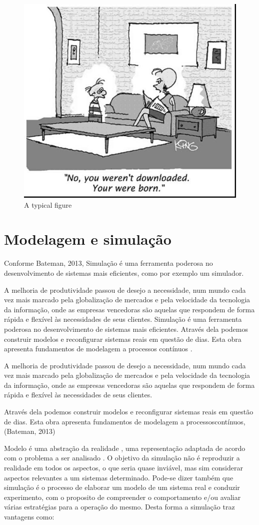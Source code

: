 \documentclass[12pt]{article}
\begin{document}
\begin{figure}[ht]
\centering
\includegraphics[width=.5\textwidth]{fig1.jpg}
\caption{A typical figure}
\label{fig:exampleFig1}
\end{figure}

\section{Modelagem e simulação}

Conforme Bateman, 2013, Simulação é uma ferramenta poderosa no 
desenvolvimento de sistemas mais eficientes, como por exemplo um simulador.

A melhoria de produtividade passou de desejo a necessidade, num mundo cada 
vez mais marcado pela globalização de mercados e pela velocidade da
tecnologia da informação, onde as empresas vencedoras são aquelas que
respondem de forma rápida e flexível às necessidades de seus clientes.
Simulação é uma ferramenta poderosa no desenvolvimento de sistemas mais
eficientes. Através dela podemos construir modelos e reconfigurar
sistemas reais em questão de dias. Esta obra apresenta fundamentos de
modelagem a processos contínuos \cite{Bateman:13}.

A melhoria de produtividade passou de desejo a necessidade, num mundo 
cada vez mais marcado pela globalização de mercados e pela velocidade
da tecnologia da informação, onde as empresas vencedoras são aquelas
que respondem de forma rápida e flexível às necessidades de seus clientes. 


Através dela podemos construir modelos e reconfigurar sistemas
reais em questão de dias. Esta obra apresenta fundamentos de modelagem 
a processoscontínuos, (Bateman, 2013)


Modelo é uma abstração da realidade , uma representação adaptada de acordo
com o problema a ser analisado . O objetivo da simulação não é reproduzir
a realidade em todos os aspectos, o que seria quase inviável, mas sim 
considerar aspectos relevantes a um sistemas determinado. Pode-se dizer
também que simulação é o processo de elaborar um modelo de um sistema
real e conduzir experimento, com o proposito de compreender o comportamento
e/ou avaliar várias estratégias para a operação do mesmo. Desta forma a
simulação traz vantagens como:
\end{document}
